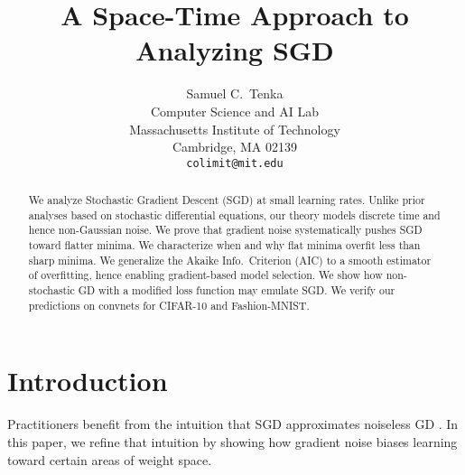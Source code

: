 \documentclass{article}
\title{%
    A Space-Time Approach to Analyzing SGD
}
\author{%
    Samuel C.~Tenka \\
    Computer Science and AI Lab \\
    Massachusetts Institute of Technology \\
    Cambridge, MA 02139 \\
    \texttt{colimit@mit.edu}
}
\theoremstyle{plain}
\theoremstyle{definition}
\begin{document}
    \maketitle
    
    
    \begin{abstract}
        We analyze Stochastic Gradient Descent (SGD) at small learning rates.
        Unlike prior analyses based on stochastic differential equations, our
        theory models discrete time and hence non-Gaussian noise.
        We prove that gradient noise systematically pushes SGD toward flatter
        minima.  We characterize when and why flat minima overfit less than
        sharp minima.  We generalize the Akaike Info.\ Criterion (AIC) to a
        smooth estimator of overfitting, hence enabling gradient-based model
        selection.  We show how non-stochastic GD with a modified loss function
        may emulate SGD.
        We verify our predictions on convnets for CIFAR-10 and Fashion-MNIST.
    \end{abstract}
    

\section{Introduction}



    Practitioners benefit from the intuition that SGD approximates noiseless GD
    \cite{bo91}.  In this paper, we refine that intuition by showing how
    gradient noise biases learning toward certain areas of weight space.
    
\end{document}
